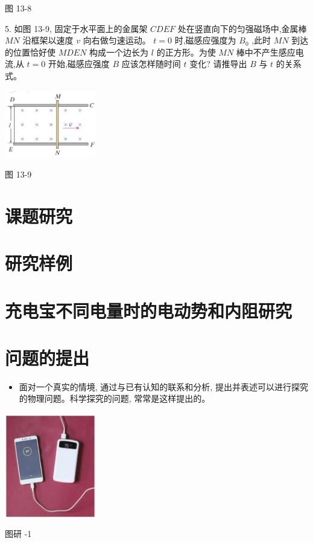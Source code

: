 \documentclass[10pt]{article}
\begin{document}
图 13-8

5. 如图 13-9, 固定于水平面上的金属架 \({CDEF}\) 处在竖直向下的匀强磁场中,金属棒 \({MN}\) 沿框架以速度 \(v\) 向右做匀速运动。 \(t = 0\) 时,磁感应强度为 \({B}_{0}\) ,此时 \({MN}\) 到达的位置恰好使 \({MDEN}\) 构成一个边长为 \(l\) 的正方形。为使 \({MN}\) 棒中不产生感应电流,从 \(t = 0\) 开始,磁感应强度 \(B\) 应该怎样随时间 \(t\) 变化? 请推导出 \(B\) 与 \(t\) 的关系式。

\begin{center}
\includegraphics[max width=0.3\textwidth]{images/01911d5f-8e38-70c0-b5b8-2b399bd115b6_135_816935.jpg}
\end{center}

图 13-9

\section*{课题研究}

\section*{研究样例}

\section*{充电宝不同电量时的电动势和内阻研究}

\section*{问题的提出}

\begin{mdframed}

\begin{itemize}
\item 面对一个真实的情境, 通过与已有认知的联系和分析, 提出并表述可以进行探究的物理问题。科学探究的问题, 常常是这样提出的。
\end{itemize}

\begin{center}
\includegraphics[max width=0.3\textwidth]{images/01911d5f-8e38-70c0-b5b8-2b399bd115b6_136_877747.jpg}
\end{center}

图研 -1

\end{mdframed}
\end{document}
